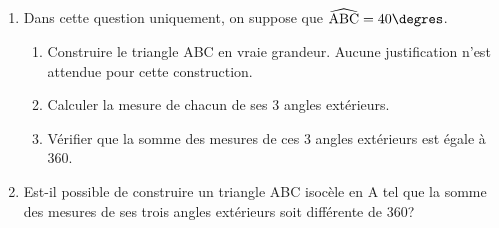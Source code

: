 \documentclass[10pt]{article}
\begin{document}
\begin{enumerate}
\item Dans cette question uniquement, on suppose que $\widehat{\text{ABC}} = 40\degres$. 
	\begin{enumerate}
		\item Construire le triangle ABC en vraie grandeur. Aucune justification n'est attendue pour cette construction. 
		\item Calculer la mesure de chacun de ses 3 angles extérieurs. 
		\item Vérifier que la somme des mesures de ces 3 angles extérieurs est égale à 360\degres.
	\end{enumerate} 
\item Est-il possible de construire un triangle ABC isocèle en A tel que la somme des mesures de ses trois angles extérieurs soit différente de $360$\degres ? 
\end{enumerate}
\end{document}
